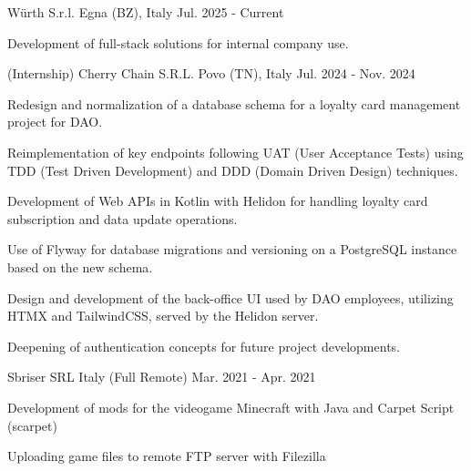
\begin{cventries}
  {Würth S.r.l.} %
  {Egna (BZ), Italy} %
  {Jul. 2025 - Current} %
  { \begin{cvitems} %
  \item {Development of full-stack solutions for internal company use.}\end{cvitems} }

  {(Internship) Cherry Chain S.R.L.} %
  {Povo (TN), Italy} %
  {Jul. 2024 - Nov. 2024} %
  { \begin{cvitems} %
  \item {Redesign and normalization of a database schema for a loyalty card management project for DAO.} \item {Reimplementation of key endpoints following UAT (User Acceptance Tests) using TDD (Test Driven Development) and DDD (Domain Driven Design) techniques.} \item {Development of Web APIs in Kotlin with Helidon for handling loyalty card subscription and data update operations.} \item {Use of Flyway for database migrations and versioning on a PostgreSQL instance based on the new schema.} \item {Design and development of the back-office UI used by DAO employees, utilizing HTMX and TailwindCSS, served by the Helidon server.} \item {Deepening of authentication concepts for future project developments.}\end{cvitems} }

  {Sbriser SRL}%
  {Italy (Full Remote)} %
  {Mar. 2021 - Apr. 2021} %
  { \begin{cvitems} %
  \item {Development of mods for the videogame Minecraft with Java and Carpet Script (scarpet)} \item {Uploading game files to remote FTP server with Filezilla}\end{cvitems} }


\end{cventries}
